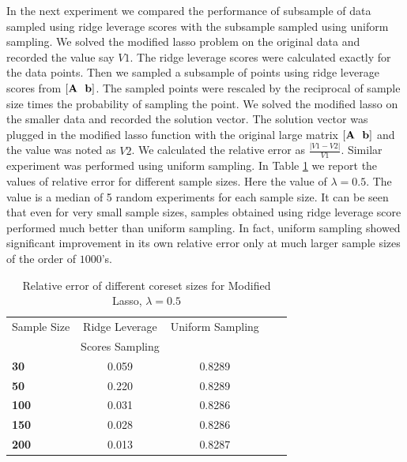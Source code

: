 In the next experiment we compared the performance of subsample of data sampled using ridge leverage scores with the subsample sampled using uniform sampling. We solved the modified lasso problem on the original data and recorded the value say $V1$. The ridge leverage scores were calculated exactly for the data points. Then we sampled a subsample of points using ridge leverage scores from $[\mathbf{A} ~~ \mathbf{b}]$. The sampled points were rescaled by the reciprocal of sample size times the probability of sampling the point. We solved the modified lasso on the smaller data and recorded the solution vector. The solution vector was plugged in the modified lasso function with the original large matrix $[\mathbf{A} ~~ \mathbf{b}]$ and the value was noted as $V2$. We calculated the relative error as $\frac{|V1-V2|}{V1}$. Similar experiment was performed using uniform sampling. In Table \ref{Table 1} we report the values of relative error for different sample sizes. Here the value of $\lambda =0.5$. The value is a median of 5 random experiments for each sample size. It can be seen that even for very small sample sizes, samples obtained using ridge leverage score performed much better than uniform sampling. In fact, uniform sampling showed significant improvement in its own relative error only at much larger sample sizes of the order of $1000$'s.
\begin{table}[t]
\caption{Relative error of different coreset sizes for Modified Lasso, $\lambda=0.5$}
\label{Table 1}
\vskip 0.15in
\begin{center}
\begin{small}
\begin{sc}
\begin{tabular}{lcccr}
\toprule
Sample Size & Ridge Leverage & Uniform Sampling \\
& Scores Sampling & \\
\midrule
\textbf{30}          & 0.059   & 0.8289     \\ 
\textbf{50}          & 0.220   & 0.8289     \\ 
\textbf{100}         & 0.031   & 0.8286     \\ 
\textbf{150}         & 0.028   & 0.8286    \\ 
\textbf{200}         & 0.013   & 0.8287     \\ 
\bottomrule
\end{tabular}
\end{sc}
\end{small}
\end{center}
\vskip -0.1in
\end{table}
